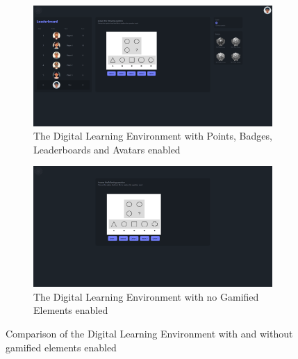 \begin{figure}[H]
  \centering
  \begin{subfigure}[t]{0.4\textwidth}
    \includegraphics[width=\textwidth]{img/question_screen.png}
    \caption{The Digital Learning Environment with Points, Badges, Leaderboards and Avatars enabled}
    \label{fig:figureScreenEnabled}
  \end{subfigure}
  \hspace{5mm}
  \begin{subfigure}[t]{0.4\textwidth}
    \includegraphics[width=\textwidth]{img/question_screen_no_elements.png}
    \caption{The Digital Learning Environment with no Gamified Elements enabled}
    \label{fig:figureScreenDisabled}
  \end{subfigure}
  \caption{Comparison of the Digital Learning Environment with and without gamified elements enabled}
\end{figure}

